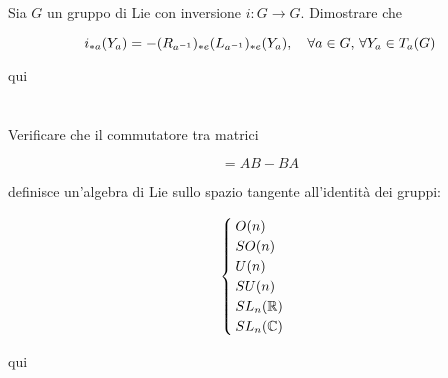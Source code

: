 \begin{tcolorbox}
	Sia $ G $ un gruppo di Lie con inversione $ i : G \to G $. Dimostrare che
	
	\begin{equation}
		i_{*a}(Y_{a}) = -(R_{a^{-1}})_{*e}(L_{a^{-1}})_{*e} (Y_{a}) \qcomma \forall a \in G, \, \forall Y_{a} \in T_{a}(G)
	\end{equation}
\end{tcolorbox}

qui

%

\newpage

%

\section{}\label{es3-9}

\begin{tcolorbox}
	Verificare che il commutatore tra matrici
	
	\begin{equation}
		[A,B] = AB - BA
	\end{equation}
	
	definisce un'algebra di Lie sullo spazio tangente all'identità dei gruppi:
	
	\begin{equation}
		\begin{cases}
			O(n)\\
			SO(n)\\
			U(n)\\
			SU(n)\\
			SL_{n}(\mathbb{R})\\
			SL_{n}(\mathbb{C})
		\end{cases}
	\end{equation}
\end{tcolorbox}

qui

%

\newpage

%

\section{}\label{es3-10}

